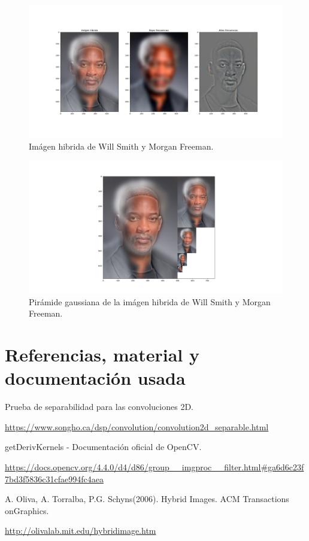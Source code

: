 \documentclass[12pt, spanish]{article}
\begin{document}
\begin{figure}[H]
  \centering
      \includegraphics[width=\textwidth]{hibridas_color/W-F.png}
 		 \caption{Imágen hibrida de Will Smith y Morgan Freeman.}
  		\label{fig:ej2al}

\end{figure}

\begin{figure}[H]
  \centering
      \includegraphics[width=\textwidth]{hibridas_color/PW-F.png}
 		 \caption{Pirámide gaussiana de la imágen hibrida de Will Smith y Morgan Freeman.}
  		\label{fig:ej2al}

\end{figure}

\newpage

\section{Referencias, material y documentación usada}


\begin{thebibliography}{9}

	Prueba de separabilidad para las convoluciones 2D.

	\url{https://www.songho.ca/dsp/convolution/convolution2d_separable.html}

	getDerivKernels - Documentación oficial de OpenCV.

	\url{https://docs.opencv.org/4.4.0/d4/d86/group__imgproc__filter.html#ga6d6c23f7bd3f5836c31cfae994fc4aea}




	A. Oliva, A. Torralba, P.G. Schyns(2006). Hybrid Images. ACM Transactions onGraphics.

	\url{http://olivalab.mit.edu/hybridimage.htm}


\end{thebibliography}
\end{document}
